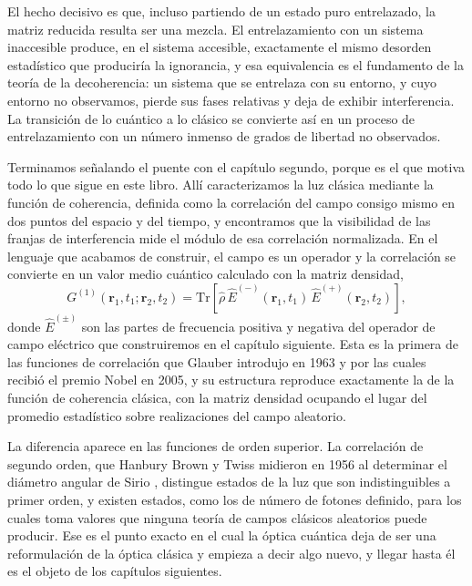         El hecho decisivo es que, incluso partiendo de un estado puro entrelazado, la matriz reducida resulta ser una mezcla. El entrelazamiento con un sistema inaccesible produce, en el sistema accesible, exactamente el mismo desorden estadístico que produciría la ignorancia, y esa equivalencia es el fundamento de la teoría de la decoherencia: un sistema que se entrelaza con su entorno, y cuyo entorno no observamos, pierde sus fases relativas y deja de exhibir interferencia. La transición de lo cuántico a lo clásico se convierte así en un proceso de entrelazamiento con un número inmenso de grados de libertad no observados.

        Terminamos señalando el puente con el capítulo segundo, porque es el que motiva todo lo que sigue en este libro. Allí caracterizamos la luz clásica mediante la función de coherencia, definida como la correlación del campo consigo mismo en dos puntos del espacio y del tiempo, y encontramos que la visibilidad de las franjas de interferencia mide el módulo de esa correlación normalizada. En el lenguaje que acabamos de construir, el campo es un operador y la correlación se convierte en un valor medio cuántico calculado con la matriz densidad,
        \begin{equation}\label{eq:CoherenciaCuantica}
            G^{(1)}\left(\mathbf{r}_{1},t_{1};\mathbf{r}_{2},t_{2}\right) = \mathrm{Tr}\left[\hat{\rho}\,\hat{E}^{(-)}(\mathbf{r}_{1},t_{1})\,\hat{E}^{(+)}(\mathbf{r}_{2},t_{2})\right],
        \end{equation}
        donde $\hat{E}^{(\pm)}$ son las partes de frecuencia positiva y negativa del operador de campo eléctrico que construiremos en el capítulo siguiente. Esta es la primera de las funciones de correlación que Glauber introdujo en 1963 \citep{glauber1963quantum} y por las cuales recibió el premio Nobel en 2005, y su estructura reproduce exactamente la de la función de coherencia clásica, con la matriz densidad ocupando el lugar del promedio estadístico sobre realizaciones del campo aleatorio.

        La diferencia aparece en las funciones de orden superior. La correlación de segundo orden, que Hanbury Brown y Twiss midieron en 1956 al determinar el diámetro angular de Sirio \citep{hanburybrown1956test}, distingue estados de la luz que son indistinguibles a primer orden, y existen estados, como los de número de fotones definido, para los cuales toma valores que ninguna teoría de campos clásicos aleatorios puede producir. Ese es el punto exacto en el cual la óptica cuántica deja de ser una reformulación de la óptica clásica y empieza a decir algo nuevo, y llegar hasta él es el objeto de los capítulos siguientes.
